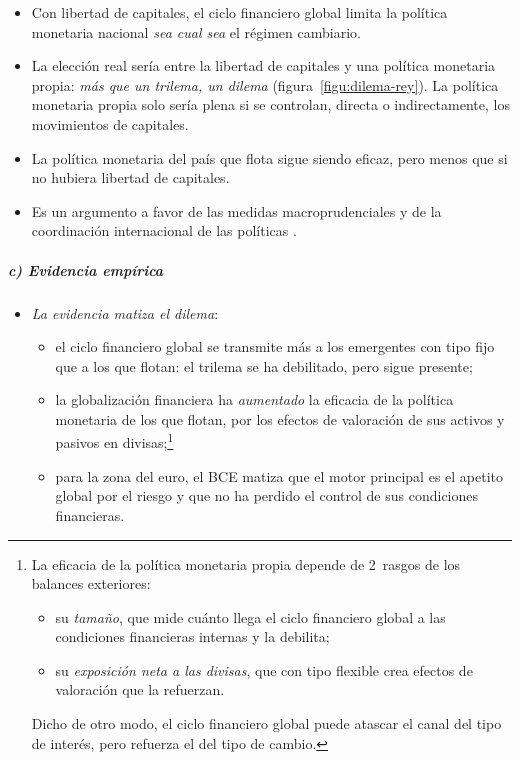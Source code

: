 \documentclass[11pt]{article}
\begin{document}
\begin{itemize}
  \begin{itemize}
  \item Con libertad de capitales, el ciclo financiero global limita la política monetaria nacional \emph{sea cual sea} el régimen cambiario.
  \item La elección real sería entre la libertad de capitales y una política monetaria propia: \emph{más que un trilema, un dilema} (figura~\ref{figu:dilema-rey}). La política monetaria propia solo sería plena si se controlan, directa o indirectamente, los movimientos de capitales.
  \item La política monetaria del país que flota sigue siendo eficaz, pero menos que si no hubiera libertad de capitales.
  \item Es un argumento a favor de las medidas macroprudenciales y de la coordinación internacional de las políticas .
  \end{itemize}
\end{itemize}

\begin{infografia}[H]
\centering
\caption{El dilema de }\label{figu:dilema-rey}
\end{infografia}

\subparagraph{c) Evidencia empírica}

\begin{itemize}
\item \emph{La evidencia matiza el dilema}:
  \begin{itemize}
  \item el ciclo financiero global se transmite más a los emergentes con tipo fijo que a los que flotan: el trilema se ha debilitado, pero sigue presente\nocite{ObstfeldOstryQureshi2019};
  \item la globalización financiera ha \emph{aumentado} la eficacia de la política monetaria de los que flotan, por los efectos de valoración de sus activos y pasivos en divisas\nocite{GeorgiadisMehl2016};\footnote{La eficacia de la política monetaria propia depende de 2~rasgos de los balances exteriores:
\begin{itemize}
\item su \emph{tamaño}, que mide cuánto llega el ciclo financiero global a las condiciones financieras internas y la debilita;
\item su \emph{exposición neta a las divisas}, que con tipo flexible crea efectos de valoración que la refuerzan.
\end{itemize}
Dicho de otro modo, el ciclo financiero global puede atascar el canal del tipo de interés, pero refuerza el del tipo de cambio\nocite{GeorgiadisMehl2016}.}
  \item para la zona del euro, el BCE matiza que el motor principal es el apetito global por el riesgo y que no ha perdido el control de sus condiciones financieras\nocite{HabibVenditti2018}.
  \end{itemize}
\end{itemize}
\end{document}
